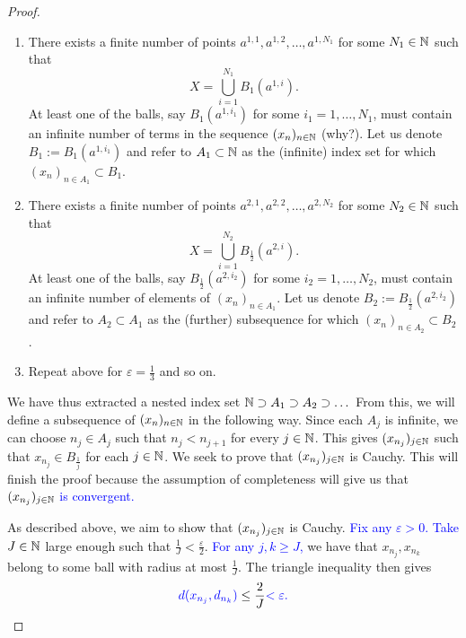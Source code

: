 \begin{proof}
	\begin{enumerate}
		\item There exists a finite number of points $a^{1,1},a^{1,2},\dots, a^{1,N_1}$ for some $N_1\in\mathbb{N}$ such that
		\[
		X = \bigcup_{i=1}^{N_1}B_1(a^{1,i}).
		\]
		At least one of the balls, say $B_1(a^{1,i_1})$ for some $i_1=1,\dots, N_1$, must contain an infinite number of terms in the sequence $(x_n)_{n\in\mathbb{N}}$ (why?). Let us denote $B_1 := B_1(a^{1,i_1})$ and refer to $A_1\subset \mathbb{N}$ as the (infinite) index set for which $(x_n)_{n\in A_1} \subset B_1$.
		\item There exists a finite number of points $a^{2,1},a^{2,2},\dots, a^{2,N_2}$ for some $N_2\in\mathbb{N}$ such that
		\[
		X = \bigcup_{i=1}^{N_2}B_\frac{1}{2}(a^{2,i}).
		\]
		At least one of the balls, say $B_\frac{1}{2}(a^{2,i_2})$ for some $i_2=1,\dots, N_2$, must contain an infinite number of elements of $(x_n)_{n\in A_1}$. Let us denote $B_2 := B_\frac{1}{2}(a^{2,i_2})$ and refer to $A_2 \subset A_1$ as the (further) subsequence for which $(x_n)_{n\in A_2}\subset B_2$.
		\item Repeat above for $\varepsilon = \frac{1}{3}$ and so on.
	\end{enumerate}
	We have thus extracted a nested index set $\mathbb{N} \supset A_1 \supset A_2\supset\dots$ From this, we will define a subsequence of $(x_n)_{n\in\mathbb{N}}$ in the following way. Since each $A_j$ is infinite, we can choose $n_j \in A_j$ such that $n_j < n_{j+1}$ for every $j\in\mathbb{N}$. This gives $(x_{n_j})_{j\in\mathbb{N}}$ such that $x_{n_j}\in B_\frac{1}{j}$ for each $j\in\mathbb{N}$. We seek to prove that $(x_{n_j})_{j\in\mathbb{N}}$ is Cauchy. This will finish the proof because the assumption of completeness will give us that \textcolor{blue}{$(x_{n_j})_{j\in\mathbb{N}}$ is convergent.} 
	
	As described above, we aim to show that $(x_{n_j})_{j\in\mathbb{N}}$ is Cauchy. \textcolor{blue}{Fix any $\varepsilon>0$. Take $J\in \mathbb{N}$} large enough such that $\frac{1}{J}< \frac{\varepsilon}{2}$. \textcolor{blue}{For any $j,k\ge J$,} we have that $x_{n_j},x_{n_k}$ belong to some ball with radius at most $\frac{1}{J}$. The triangle inequality then gives
	\[
	\textcolor{blue}{d(x_{n_j},d_{n_k})}\le \frac{2}{J} \textcolor{blue}{< \varepsilon.}
	\]
\end{proof}

